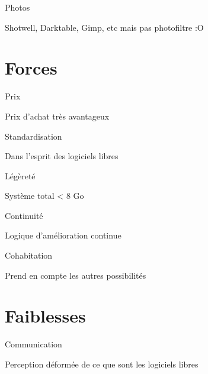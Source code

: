 \documentclass[xcolor=svgnames]{beamer}
\begin{document}
    \begin{frame}{Photos}
    
        Shotwell, Darktable, Gimp, etc \pause mais pas photofiltre :O
        
    \end{frame}
    
    
\section{Forces}

    \begin{frame}{Prix}
    
        Prix d’achat très avantageux
        
    \end{frame}
    
    \begin{frame}{Standardisation}
    
        Dans l’esprit des logiciels libres
        
    \end{frame}
    
    \begin{frame}{Légèreté}
        
        Système total < 8 Go
        
    \end{frame}
    
    \begin{frame}{Continuité}
    
        Logique d’amélioration continue
        
    \end{frame}
    
    \begin{frame}{Cohabitation}
    
        Prend en compte les autres possibilités
        
    \end{frame}


\section{Faiblesses}

    \begin{frame}{Communication}
    
        Perception déformée de ce que sont les logiciels libres
        
    \end{frame}
    
\end{document}
